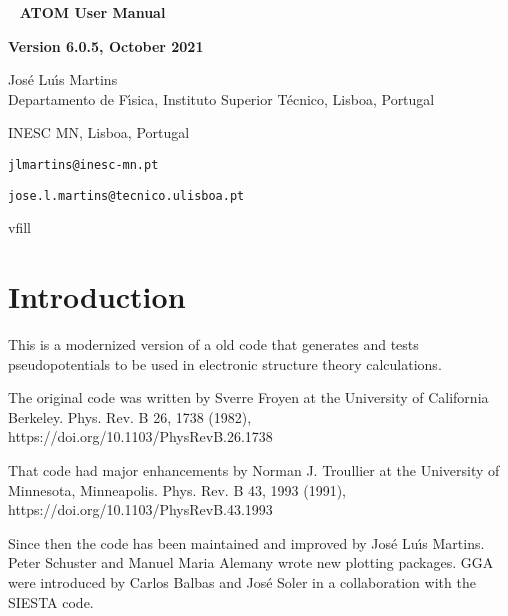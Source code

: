 \documentclass[11pt]{article}
\begin{document}

\begin{titlepage}

\begin{center}
~
\vfill
\vspace{1cm}
{\Huge {\bf ATOM User Manual}}
\par\vspace{3cm}
\hrulefill
\par\vspace{3cm}
{\Large {\bf Version 6.0.5, October 2021}}
\par\vspace{2cm}
\hrulefill

{\Large Jos\'e Lu\'{\i}s Martins \\
Departamento de F\'{\i}sica, Instituto Superior T\'ecnico, Lisboa, Portugal

INESC MN, Lisboa, Portugal

\texttt{jlmartins@inesc-mn.pt}

\texttt{jose.l.martins@tecnico.ulisboa.pt}
}
vfill
\end{center}

\end{titlepage}

\tableofcontents
\newpage

\section{Introduction}
\label{sec:intro}

This is a modernized version of a old code that generates and tests pseudopotentials to be
used in electronic structure theory calculations.

The original code was written by Sverre Froyen at the University of California Berkeley. 
Phys. Rev. B 26, 1738 (1982), https://doi.org/10.1103/PhysRevB.26.1738

That code had major enhancements by Norman J. Troullier at the University of Minnesota, Minneapolis.
Phys. Rev. B 43, 1993 (1991), https://doi.org/10.1103/PhysRevB.43.1993

Since then the code has been maintained and improved by Jos\'e Lu\'{\i}s Martins.  Peter Schuster and Manuel Maria Alemany
wrote new plotting packages.  GGA were introduced by Carlos Balbas and José Soler in a collaboration
with the SIESTA code.
\end{document}
